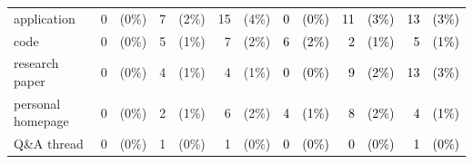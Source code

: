 \documentclass[smallextended]{svjour3}       %
\newcommand{\fix}[1]{\textcolor{black}{#1}}
\begin{document}
\begin{table}[t]
{\begin{tabular}{lr@{}rr@{}rr@{}r|r@{}rr@{}rr@{}r}
application                            & 0                             & (0\%)                             & 7                             & (2\%)                             & 15                            & (4\%)                             & \fix{ 0}                             & \fix{ (0\%)}                             & \fix{ 11}                            & \fix{ (3\%)}                             & \fix{ 13}                            & \fix{ (3\%)}                             \\
code                                   & 0                             & (0\%)                             & 5                             & (1\%)                             & 7                             & (2\%)                             & \fix{ 6}                             & \fix{ (2\%)}                             & \fix{ 2}                             & \fix{ (1\%)}                             & \fix{ 5}                             & \fix{ (1\%)}                             \\
research paper                         & 0                             & (0\%)                             & 4                             & (1\%)                             & 4                             & (1\%)                             & \fix{ 0}                             & \fix{ (0\%)}                             & \fix{ 9}                             & \fix{ (2\%)}                             & \fix{ 13}                            & \fix{ (3\%)}                             \\
personal homepage                      & 0                             & (0\%)                             & 2                             & (1\%)                             & 6                             & (2\%)                             & \fix{ 4}                             & \fix{ (1\%)}                             & \fix{ 8}                             & \fix{ (2\%)}                             & \fix{ 4}                             & \fix{ (1\%)}                             \\
Q\&A thread                            & 0                             & (0\%)                             & 1                             & (0\%)                             & 1                             & (0\%)                             & \fix{ 0}                             & \fix{ (0\%)}                             & \fix{ 0}                             & \fix{ (0\%)}                             & \fix{ 1}                             & \fix{ (0\%)}                             \\

\end{tabular}}
\end{table}
\end{document}

